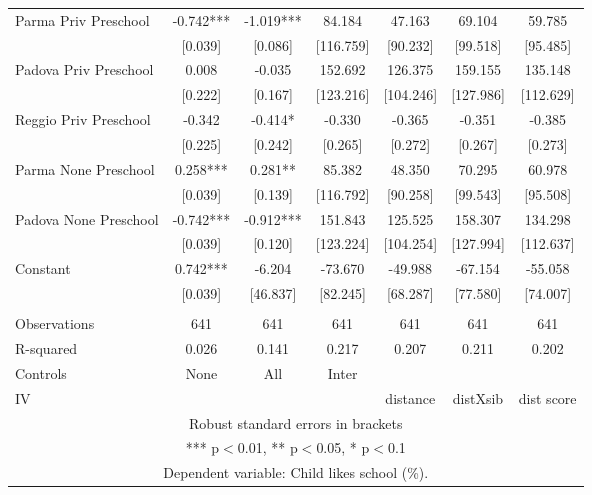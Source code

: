 \begin{tabular}{lcccccc}
Parma Priv Preschool & -0.742*** & -1.019*** & 84.184 & 47.163 & 69.104 & 59.785 \\
 & [0.039] & [0.086] & [116.759] & [90.232] & [99.518] & [95.485] \\
Padova Priv Preschool & 0.008 & -0.035 & 152.692 & 126.375 & 159.155 & 135.148 \\
 & [0.222] & [0.167] & [123.216] & [104.246] & [127.986] & [112.629] \\
Reggio Priv Preschool & -0.342 & -0.414* & -0.330 & -0.365 & -0.351 & -0.385 \\
 & [0.225] & [0.242] & [0.265] & [0.272] & [0.267] & [0.273] \\
Parma None Preschool & 0.258*** & 0.281** & 85.382 & 48.350 & 70.295 & 60.978 \\
 & [0.039] & [0.139] & [116.792] & [90.258] & [99.543] & [95.508] \\
Padova None Preschool & -0.742*** & -0.912*** & 151.843 & 125.525 & 158.307 & 134.298 \\
 & [0.039] & [0.120] & [123.224] & [104.254] & [127.994] & [112.637] \\
Constant & 0.742*** & -6.204 & -73.670 & -49.988 & -67.154 & -55.058 \\
 & [0.039] & [46.837] & [82.245] & [68.287] & [77.580] & [74.007] \\
 &  &  &  &  &  &  \\
Observations & 641 & 641 & 641 & 641 & 641 & 641 \\
R-squared & 0.026 & 0.141 & 0.217 & 0.207 & 0.211 & 0.202 \\
Controls & None & All & Inter &  &  &  \\
 IV &  &  &  & distance & distXsib & dist score \\ \hline
\multicolumn{7}{c}{ Robust standard errors in brackets} \\
\multicolumn{7}{c}{ *** p$<$0.01, ** p$<$0.05, * p$<$0.1} \\
\multicolumn{7}{c}{ Dependent variable: Child likes school (\%).} \\
\end{tabular}
